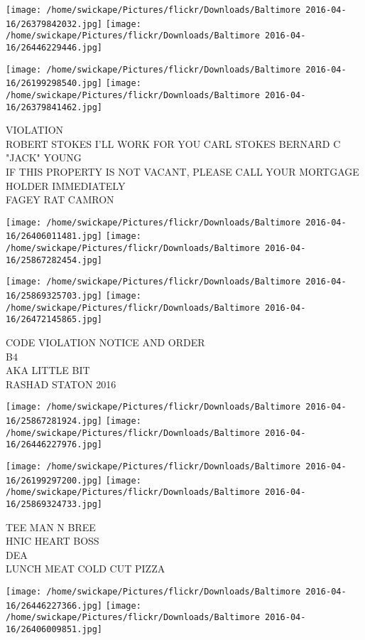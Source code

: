\documentclass[10pt,letterpaper]{article}
\begin{document}
\texttt{[image: /home/swickape/Pictures/flickr/Downloads/Baltimore 2016-04-16/26379842032.jpg]}
\texttt{[image: /home/swickape/Pictures/flickr/Downloads/Baltimore 2016-04-16/26446229446.jpg]}

\texttt{[image: /home/swickape/Pictures/flickr/Downloads/Baltimore 2016-04-16/26199298540.jpg]}
\texttt{[image: /home/swickape/Pictures/flickr/Downloads/Baltimore 2016-04-16/26379841462.jpg]}

VIOLATION\\
ROBERT STOKES I'LL WORK FOR YOU CARL STOKES BERNARD C "JACK" YOUNG\\
IF THIS PROPERTY IS NOT VACANT, PLEASE CALL YOUR MORTGAGE HOLDER IMMEDIATELY\\
FAGEY RAT CAMRON
\pagebreak

\texttt{[image: /home/swickape/Pictures/flickr/Downloads/Baltimore 2016-04-16/26406011481.jpg]}
\texttt{[image: /home/swickape/Pictures/flickr/Downloads/Baltimore 2016-04-16/25867282454.jpg]}

\texttt{[image: /home/swickape/Pictures/flickr/Downloads/Baltimore 2016-04-16/25869325703.jpg]}
\texttt{[image: /home/swickape/Pictures/flickr/Downloads/Baltimore 2016-04-16/26472145865.jpg]}

CODE VIOLATION NOTICE AND ORDER\\
B4\\
AKA LITTLE BIT\\
RASHAD STATON 2016
\pagebreak

\texttt{[image: /home/swickape/Pictures/flickr/Downloads/Baltimore 2016-04-16/25867281924.jpg]}
\texttt{[image: /home/swickape/Pictures/flickr/Downloads/Baltimore 2016-04-16/26446227976.jpg]}

\texttt{[image: /home/swickape/Pictures/flickr/Downloads/Baltimore 2016-04-16/26199297200.jpg]}
\texttt{[image: /home/swickape/Pictures/flickr/Downloads/Baltimore 2016-04-16/25869324733.jpg]}

TEE MAN N BREE\\
HNIC HEART BOSS\\
DEA\\
LUNCH MEAT COLD CUT PIZZA
\pagebreak

\texttt{[image: /home/swickape/Pictures/flickr/Downloads/Baltimore 2016-04-16/26446227366.jpg]}
\texttt{[image: /home/swickape/Pictures/flickr/Downloads/Baltimore 2016-04-16/26406009851.jpg]}
\end{document}
